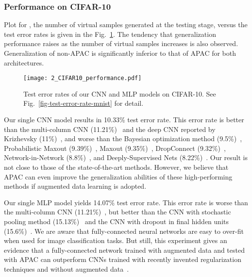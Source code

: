 \documentclass[10pt,twocolumn,letterpaper]{article}
\begin{document}
\subsubsection{Performance on CIFAR-10}
Plot for , the number of virtual samples generated at the testing stage, 
versus the test error rates is given in the Fig.~\ref{fig-test-error-rate-cifar}.
The tendency that generalization performance raises 
as the number of virtual samples increases is also observed.
Generalization of non-APAC is significantly inferior to that of APAC for both architectures.

\begin{figure}[t]
\begin{center}
\texttt{[image: 2\_CIFAR10\_performance.pdf]}
\end{center}
\caption{Test error rates of our CNN and MLP models on CIFAR-10.
See Fig.~\ref{fig-test-error-rate-mnist} for detail.}
\label{fig-test-error-rate-cifar}
\end{figure}

Our single CNN model results in 10.33\% test error rate.
This error rate is better than the multi-column CNN (11.21\%)~\cite{Ciresan:2012b} and
the deep CNN reported by Krizhevsky \etal (11\%)~\cite{NIPS2012_4824}, and
worse than the Bayesian optimization method (9.5\%)~\cite{68},
Probabilistic Maxout (9.39\%)~\cite{SprRied2014a}, 
Maxout (9.35\%)~\cite{DBLP:conf/icml/GoodfellowWMCB13}, 
DropConnect (9.32\%)~\cite{icml2013_wan13}, 
Network-in-Network (8.8\%)~\cite{Lin2014}, and
Deeply-Supervised Nets (8.22\%)~\cite{2014arXiv1409.5185L}.
Our result is not close to those of the state-of-the-art methods.
However, we believe that APAC can even improve the generalization abilities of these high-performing methods
if augmented data learning is adopted.

Our single MLP model yields 14.07\% test error rate.
This error rate is worse than the multi-column CNN (11.21\%)~\cite{Ciresan:2012b},
but better than the CNN with stochastic pooling method (15.13\%)~\cite{2013arXiv1301.3557Z} and
the CNN with dropout in final hidden units (15.6\%)~\cite{2012arXiv1207.0580H}.
We are aware that fully-connected neural networks are easy to over-fit when used for image classification tasks.
But still, this experiment gives an evidence that 
a fully-connected network trained with augmented data and tested with APAC can outperform
CNNs trained with recently invented regularization techniques and 
without augmented data~\cite{2013arXiv1301.3557Z, 2012arXiv1207.0580H}.
\end{document}
